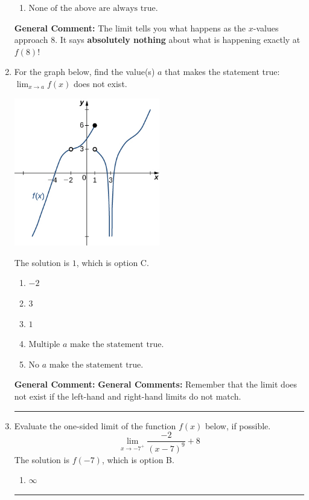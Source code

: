 \documentclass{extbook}[14pt]
\newcommand{\litem}[1]{\item #1

\rule{\textwidth}{0.4pt}}
\begin{document}
\begin{enumerate}
{\begin{enumerate}[label=\Alph*.]
\item \( \text{None of the above are always true.} \)


\end{enumerate}

\textbf{General Comment:} The limit tells you what happens as the $x$-values approach $8$. It says \textbf{absolutely nothing} about what is happening exactly at $f(8)$!
}
\litem{
For the graph below, find the value(s) $a$ that makes the statement true: $ \displaystyle \lim_{x \rightarrow a} f(x)$ does not exist.

\begin{center}
    \includegraphics[width=0.5\textwidth]{../Figures/evaluateLimitGraphicallyC.png}
\end{center}


The solution is \( 1 \), which is option C.\begin{enumerate}[label=\Alph*.]
\item \( -2 \)


\item \( 3 \)


\item \( 1 \)


\item \( \text{Multiple } a \text{ make the statement true}. \)


\item \( \text{No } a \text{ make the statement true}. \)


\end{enumerate}

\textbf{General Comment:} \textbf{General Comments:} Remember that the limit does not exist if the left-hand and right-hand limits do not match.
}
\litem{
Evaluate the one-sided limit of the function $f(x)$ below, if possible.
\[ \lim_{x \rightarrow -7^+} \frac{-2}{(x-7)^9}+8 \]The solution is \( f(-7) \), which is option B.\begin{enumerate}[label=\Alph*.]
\item \( \infty \)



\end{enumerate}}
\end{enumerate}
\end{document}
